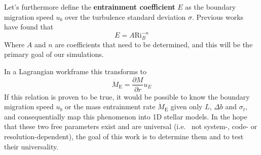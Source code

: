 Let's furthermore define the \textbf{entrainment coefficient} $E$ as the boundary migration speed $u_b$ over the turbulence standard deviation $\sigma$. Previous works have found that
\begin{equation}
	E=A \mathrm{Ri}_{B}^{-n}
\end{equation}
Where $A$ and $n$ are coefficients that need to be determined, and this will be the primary goal of our simulations.

In a Lagrangian workframe this transforms to
\begin{equation}
	\dot{M}_\mathrm{E}=\frac{\partial M}{\partial r} u_E
\end{equation}
If this relation is proven to be true, it would be possible to know the boundary migration speed $u_b$ or the mass entrainment rate $\dot{M}_\mathrm{E}$ given only $L$, $\Delta b$ and $\sigma_t$, and consequentially map this phenomenon into 1D stellar models. In the hope that these two free parameters exist and are universal (i.e. \ not system-, code- or resolution-dependent), the goal of this work is to determine them and to test their universality.

